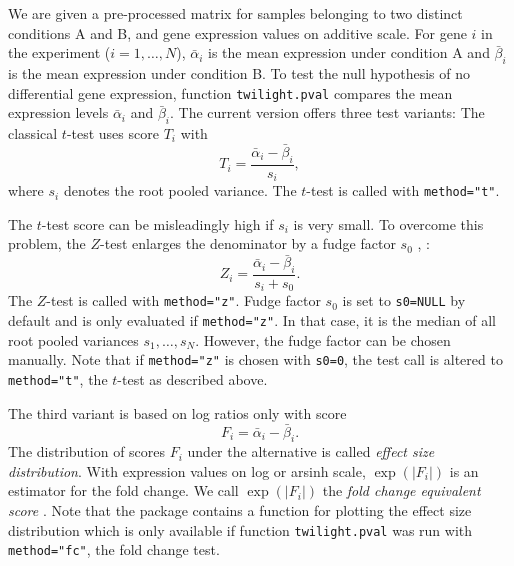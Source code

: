 \documentclass[11pt,a4paper,fleqn]{report}
\newcommand{\Rfunction}[1]{{\texttt{#1}}}
\newcommand{\Rfunarg}[1]{{\texttt{#1}}}
\begin{document}
We are given a pre-processed matrix for samples belonging to two distinct conditions A and B, and gene expression values on additive scale. For gene $i$ in the experiment ($i=1,\dots,N$), $\bar \alpha_i$ is the mean expression under condition A and $\bar \beta_i$ is the mean expression under condition B. To test the null hypothesis of no differential gene expression, function \Rfunction{twilight.pval} compares the mean expression levels $\bar \alpha_i$ and $\bar \beta_i$. The current version offers three test variants: The classical $t$-test uses score $T_i$ with
\begin{equation}
  T_i=\frac{\bar \alpha_i - \bar \beta_i }{s_i},
\end{equation}
where $s_i$ denotes the root pooled variance. The $t$-test is called with \Rfunarg{method="t"}.

The $t$-test score can be misleadingly high if $s_i$ is very small. To overcome this problem, the $Z$-test enlarges the denominator by a fudge factor $s_0$ \cite{tusher01}, \cite{efron01}:
\begin{equation}
  Z_i=\frac{\bar \alpha_i - \bar \beta_i}{s_i + s_0}.
\end{equation}
The $Z$-test is called with \Rfunarg{method="z"}. Fudge factor $s_0$ is set to \Rfunarg{s0=NULL} by default and is only evaluated if \Rfunarg{method="z"}. In that case, it is the median of all root pooled variances $s_1,\dots,s_N$. However, the fudge factor can be chosen manually. Note that if \Rfunarg{method="z"} is chosen with \Rfunarg{s0=0}, the test call is altered to \Rfunarg{method="t"}, the $t$-test as described above.

The third variant is based on log ratios only with score
\begin{equation}
  F_i=\bar \alpha_i - \bar \beta_i.
\end{equation}
The distribution of scores $F_i$ under the alternative is called \textit{effect size distribution}. With expression values on log or arsinh scale, $\exp (|F_i|)$ is an estimator for the fold change. We call $\exp (|F_i|)$ the \textit{fold change equivalent score} \cite{scheid04}. Note that the package contains a function for plotting the effect size distribution which is only available if function \Rfunction{twilight.pval} was run with \Rfunarg{method="fc"}, the fold change test.
\end{document}
